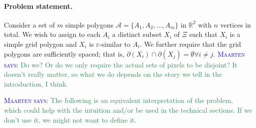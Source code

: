 \documentclass{paper}
\newcommand{\mremark}[3]{\textcolor{blue}{\textsc{#1 #2:}} \textcolor{SeaGreen}{\textsf{#3}}}
\newcommand{\maarten}[2][says]{\mremark{Maarten}{#1}{#2}}
\newcommand{\eps}{\varepsilon}
\begin{document}
\paragraph {Problem statement.}

Consider a set of $m$ simple polygons $\mathcal{A} = \{A_1, A_2, \ldots, A_m\}$ in $\mathbb{R}^2$ with $n$ vertices in total.
We wish to assign to each $A_i$ a distinct subset $X_i$ of $\Xi$ such that $X_i$ is a simple grid polygon and $X_i$ is $\eps$-similar to $A_i$.
We further require that the grid polygons are sufficiently spaced; that is, $\partial(X_i) \cap \partial(X_j) = \emptyset \forall i \ne j$. \maarten {Do we? Or do we only require the actual sets of pixels to be disjoint? It doesn't really matter, so what we do depends on the story we tell in the introduction, I think.}

\maarten {The following is an equivalent interpretation of the problem, which could help with the intuition and/or be used in the technical sections. If we don't use it, we might not want to define it.}
\end{document}
